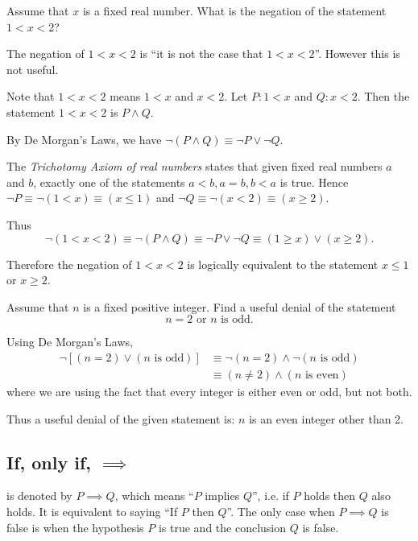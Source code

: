 \begin{exercise}{}{}
Assume that $x$ is a fixed real number. What is the negation of the statement $1<x<2$?
\end{exercise}
\begin{solution}
The negation of $1<x<2$ is ``it is not the case that $1<x<2$”. However this is not useful.

Note that $1<x<2$ means $1<x$ and $x<2$. Let $P:1<x$ and $Q:x<2$. Then the statement $1<x<2$ is $P \land Q$.

By De Morgan's Laws, we have $\lnot (P \land Q) \equiv \lnot P \lor \lnot Q$.

The \emph{Trichotomy Axiom of real numbers} states that given fixed real numbers $a$ and $b$, exactly one of the statements $a<b, a=b, b<a$ is true. Hence $\lnot P \equiv \lnot (1<x) \equiv (x \le 1)$ and $\lnot Q \equiv \lnot (x<2) \equiv (x \ge 2)$.

Thus
\[ \lnot (1<x<2) \equiv \lnot (P \land Q) \equiv \lnot P \lor \lnot Q \equiv (1 \ge x) \lor (x \ge 2). \]

Therefore the negation of $1<x<2$ is logically equivalent to the statement $x \le 1$ or $x \ge 2$.
\end{solution}

\begin{exercise}{}{}
Assume that $n$ is a fixed positive integer. Find a useful denial of the statement
\[ n = 2 \text{ or } n \text{ is odd.} \]
\end{exercise}
\begin{solution}
Using De Morgan's Laws,
\begin{align*}
\lnot [(n = 2) \lor (n \text{ is odd})] &\equiv \lnot(n = 2) \land \lnot(n \text{ is odd}) \\
&\equiv (n \neq 2) \land (n \text{ is even})
\end{align*}
where we are using the fact that every integer is either even or odd, but not both.

Thus a useful denial of the given statement is: $n$ is an even integer other than 2.
\end{solution}
\pagebreak

\subsection{If, only if, $\implies$}
 is denoted by $P \implies Q$, which means ``$P$ implies $Q$'', i.e. if $P$ holds then $Q$ also holds. It is equivalent to saying ``If $P$ then $Q$''. The only case when $P \implies Q$ is false is when the hypothesis $P$ is true and the conclusion $Q$ is false.

